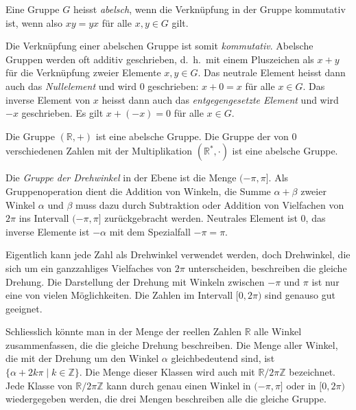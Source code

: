 \begin{definition}
\label{buch:gruppen:definition:abelsch}
Eine Gruppe $G$ heisst {\em abelsch}, wenn 
%
die Verknüpfung in der Gruppe kommutativ ist, wenn also
$xy=yx$ für alle $x,y\in G$ gilt.
\end{definition}

Die Verknüpfung einer abelschen Gruppe ist somit {\em kommutativ}.
%
Abelsche Gruppen werden oft additiv geschrieben, d.~h.~mit einem
Pluszeichen als $x+y$ für die Verknüpfung zweier Elemente $x,y\in G$.
Das neutrale Element heisst dann auch das {\em Nullelement} und wird $0$
%
geschrieben: $x+0=x$ für alle $x\in G$.
Das inverse Element von $x$ heisst dann auch das
{\em entgegengesetzte Element} und wird $-x$ geschrieben. 
%
Es gilt $x+(-x)=0$ für alle $x\in G$.

\begin{beispiel}
Die Gruppe $(\mathbb{R},+)$ ist eine abelsche Gruppe.
Die Gruppe der von $0$ verschiedenen Zahlen mit der Multiplikation
$(\mathbb{R}^*,\cdot)$ ist eine abelsche Gruppe.
\end{beispiel}

\begin{beispiel}
Die {\em Gruppe der Drehwinkel} in der Ebene ist die Menge
$
(-\pi,\pi]
$.
Als Gruppenoperation dient die Addition von Winkeln, die Summe
$\alpha+\beta$ zweier Winkel $\alpha$ und $\beta$ muss dazu durch
Subtraktion oder Addition von Vielfachen von $2\pi$ ins Intervall
$(-\pi,\pi]$ zurückgebracht werden.
Neutrales Element ist $0$, das inverse Elemente ist $-\alpha$ mit
dem Spezialfall $-\pi=\pi$.

Eigentlich kann jede Zahl als Drehwinkel verwendet werden, doch
Drehwinkel, die sich um ein ganzzahliges Vielfaches von $2\pi$ unterscheiden,
beschreiben die gleiche Drehung.
Die Darstellung der Drehung mit Winkeln zwischen $-\pi$ und $\pi$ ist nur
eine von vielen Möglichkeiten.
Die Zahlen im Intervall $[0,2\pi)$ sind genauso gut geeignet.

Schliesslich könnte man in der Menge der reellen Zahlen $\mathbb{R}$
alle Winkel zusammenfassen, die die gleiche Drehung beschreiben.
Die Menge aller Winkel, die mit der Drehung um den Winkel $\alpha$
gleichbedeutend sind, ist $\{\alpha + 2k\pi\mid k\in\mathbb{Z}\}$.
Die Menge dieser Klassen wird auch mit $\mathbb{R}/2\pi\mathbb{Z}$
bezeichnet.
Jede Klasse von $\mathbb{R}/2\pi\mathbb{Z}$ kann durch genau einen
Winkel in $(-\pi,\pi]$ oder in $[0,2\pi)$ wiedergegeben werden,
die drei Mengen beschreiben alle die gleiche Gruppe.
\end{beispiel}

